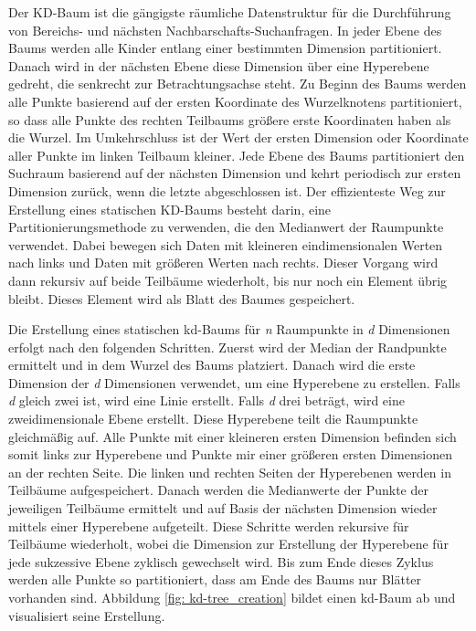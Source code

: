 Der KD-Baum ist die gängigste räumliche Datenstruktur für die Durchführung von Bereichs- und nächsten Nachbarschafts-Suchanfragen. In jeder Ebene des Baums werden alle Kinder entlang einer bestimmten Dimension partitioniert. Danach wird in der nächsten Ebene diese Dimension über eine Hyperebene gedreht, die senkrecht zur Betrachtungsachse steht. Zu Beginn des Baums werden alle Punkte basierend auf der ersten Koordinate des Wurzelknotens partitioniert, so dass alle Punkte des rechten Teilbaums größere erste Koordinaten haben als die Wurzel. Im Umkehrschluss ist der Wert der ersten Dimension oder Koordinate aller Punkte im linken Teilbaum kleiner. Jede Ebene des Baums partitioniert den Suchraum basierend auf der nächsten Dimension und kehrt periodisch zur ersten Dimension zurück, wenn die letzte abgeschlossen ist. Der effizienteste Weg zur Erstellung eines statischen KD-Baums besteht darin, eine Partitionierungsmethode zu verwenden, die den Medianwert der Raumpunkte verwendet. Dabei bewegen sich Daten mit kleineren eindimensionalen Werten nach links und Daten mit größeren Werten nach rechts. Dieser Vorgang wird dann rekursiv auf beide Teilbäume wiederholt, bis nur noch ein Element übrig bleibt. Dieses Element wird als Blatt des Baumes gespeichert. \autocite[92]{saha_advanced_2019}

Die Erstellung eines statischen kd-Baums für \textit{n} Raumpunkte in \textit{d} Dimensionen erfolgt nach den folgenden Schritten. Zuerst wird der Median der Randpunkte ermittelt und in dem Wurzel des Baums platziert. Danach wird die erste Dimension der \textit{d} Dimensionen verwendet, um eine Hyperebene zu erstellen. Falls \textit{d} gleich zwei ist, wird eine Linie erstellt. Falls \textit{d} drei beträgt, wird eine zweidimensionale Ebene erstellt. Diese Hyperebene teilt die Raumpunkte gleichmäßig auf. Alle Punkte mit einer kleineren ersten Dimension befinden sich somit links zur Hyperebene und Punkte mir einer größeren ersten Dimensionen an der rechten Seite. Die linken und rechten Seiten der Hyperebenen werden in Teilbäume aufgespeichert. Danach werden die Medianwerte der Punkte der jeweiligen Teilbäume ermittelt und auf Basis der nächsten Dimension wieder mittels einer Hyperebene aufgeteilt. Diese Schritte werden rekursive für Teilbäume wiederholt, wobei die Dimension zur Erstellung der Hyperebene für jede sukzessive Ebene zyklisch gewechselt wird. Bis zum Ende dieses Zyklus werden alle Punkte so partitioniert, dass am Ende des Baums nur Blätter vorhanden sind. Abbildung \ref{fig: kd-tree_creation} bildet einen kd-Baum ab und visualisiert seine Erstellung. \autocite[93-94]{saha_advanced_2019} 

